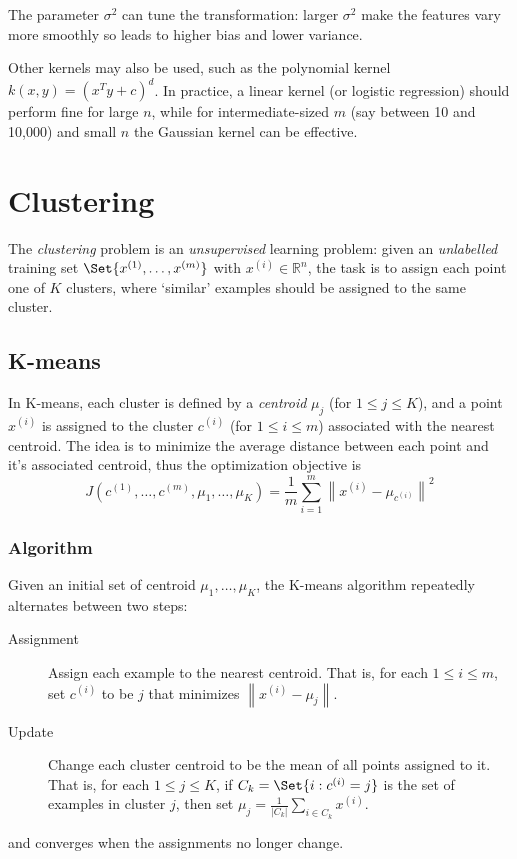 \documentclass[a4paper,12pt]{article}
\theoremstyle{definition}
\newcommand{\R}{\mathbb{R}}
\newcommand{\norm}[1]{\left\lVert#1\right\rVert}
\begin{document}
The parameter $\sigma^2$ can tune the transformation: larger $\sigma^2$ make the features vary more smoothly so leads to higher bias and lower variance.

Other kernels may also be used, such as the polynomial kernel $k(x, y) = (x^T y + c)^d$. In practice, a linear kernel (or logistic regression) should perform fine for large $n$, while for intermediate-sized $m$ (say between 10 and 10,000) and small $n$ the Gaussian kernel can be effective.

\section{Clustering}
The \emph{clustering} problem is an \emph{unsupervised} learning problem: given an \emph{unlabelled} training set $\Set{x^{(1)}, \ldots, x^{(m)}}$ with $x^{(i)} \in \R^n$, the task is to assign each point one of $K$ clusters, where `similar' examples should be assigned to the same cluster.

\subsection{K-means}
In {K-means}, each cluster is defined by a \emph{centroid} $\mu_j$ (for $1 \le j \le K$), and a point $x^{(i)}$ is assigned to the cluster $c^{(i)}$ (for $1 \le i \le m$) associated with the nearest centroid. The idea is to minimize the average distance between each point and it's associated centroid, thus the optimization objective is
\[
J(c^{(1)}, \ldots, c^{(m)}, \mu_1, \ldots, \mu_K) = \frac{1}{m} \sum_{i=1}^{m} \norm{x^{(i)} - \mu_{c^{(i)}}}^2
\]

\subsubsection{Algorithm}

Given an initial set of centroid $\mu_1, \ldots, \mu_K$, the K-means algorithm repeatedly alternates between two steps:
\begin{description}
\item[Assignment] Assign each example to the nearest centroid. That is, for each $1 \le i \le m$, set $c^{(i)}$ to be $j$ that minimizes $\norm{x^{(i)} - \mu_j}$.
\item[Update] Change each cluster centroid to be the mean of all points assigned to it. That is, for each $1 \le j \le K$, if $C_k = \Set{i : c^{(i)} = j}$ is the set of examples in cluster $j$, then set $\mu_j = \frac{1}{|C_k|} \sum_{i \in C_k} x^{(i)}$.
\end{description}
and converges when the assignments no longer change.
\end{document}
